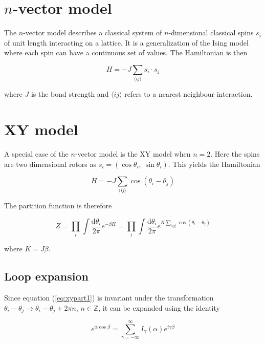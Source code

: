 
\section{$n$-vector model}
\label{sec:nVector}

The $n$-vector model describes a classical system of $n$-dimensional classical spins $s_i$ of unit length interacting on a lattice. It is a generalization of the Ising model where each spin can have a continuous set of values. The Hamiltonian is then

\begin{equation}
    H = -J\sum_{\langle ij \rangle} s_i \cdot s_j
\end{equation}

where $J$ is the bond strength and $\langle ij \rangle$ refers to a nearest neighbour interaction.

\section{XY model}
\label{sec:XYModel}

A special case of the $n$-vector model is the XY model when $n = 2$. Here the spins are two dimensional rotors as $s_i = (\cos \theta_i, \  \sin \theta_i)$. This yields the Hamiltonian

\begin{equation}
    H = - J \sum_{\langle ij \rangle} \cos(\theta_i - \theta_j)
\end{equation}

The partition function is therefore

\begin{equation}
    Z = \prod_i \int \frac{\mathrm d \theta_i}{2 \pi} e^{-\beta H} = \prod_i \int \frac{\mathrm d \theta_i}{2 \pi} e^{K \sum_{\langle ij \rangle} \cos(\theta_i - \theta_j)}
\label{eq:xypart1}
\end{equation}

where $K = J \beta$.

\subsection{Loop expansion}
\label{subsec:XYLoopexp}

Since equation (\ref{eq:xypart1}) is invariant under the transformation $\theta_i - \theta_j \rightarrow \theta_i - \theta_j + 2 \pi n$, $n \in \mathbb{Z}$, it can be expanded using the identity

\begin{equation}
    e^{\alpha \cos \beta} = \sum_{\gamma = -\infty}^{\infty} I_\gamma ( \alpha ) e^{i \gamma \beta}
\end{equation}

